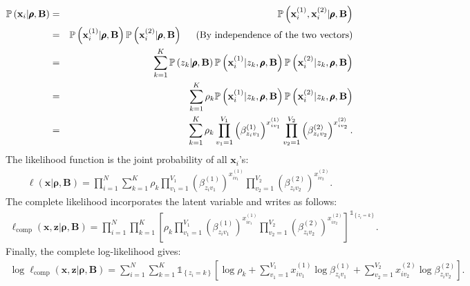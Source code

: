 \documentclass[a4paper, 11pt]{article}
\begin{document}
\begin{eqnarray}
\mathbb{P}\left( \mathbf{x}_i | \pmb{\rho}, \mathbf{B} \right) &=& \mathbb{P}\left( \mathbf{x}_i^{(1)}, \mathbf{x}_i^{(2)} | \pmb{\rho}, \mathbf{B} \right) \nonumber \\
&=& \mathbb{P}\left(\mathbf{x}_i^{(1)} | \pmb{\rho}, \mathbf{B}\right)\mathbb{P}\left(\mathbf{x}_i^{(2)} | \pmb{\rho}, \mathbf{B}\right)\hspace{0.5cm} \text{(By independence of the two vectors)} \nonumber \\
&=& \sum_{k=1}^{K} \mathbb{P}\left(z_k | \pmb{\rho}, \mathbf{B}\right)\mathbb{P}\left(\mathbf{x}_i^{(1)} | z_k, \pmb{\rho}, \mathbf{B}\right)\mathbb{P}\left(\mathbf{x}_i^{(2)} | z_k, \pmb{\rho}, \mathbf{B}\right)\nonumber \\
&=& \sum_{k=1}^{K} \rho_k \mathbb{P}\left(\mathbf{x}_i^{(1)} | z_k, \pmb{\rho}, \mathbf{B}\right)\mathbb{P}\left(\mathbf{x}_i^{(2)} | z_k, \pmb{\rho}, \mathbf{B}\right)\nonumber \\
&=& \sum_{k=1}^{K} \rho_k \prod_{v_1=1}^{V_1} \left( \beta_{z_i v_1}^{(1)} \right)^{x_{i v_1}^{(1)}} \prod_{v_2=1}^{V_2} \left( \beta_{z_i v_2}^{(2)} \right)^{x_{i v_2}^{(2)}}. \nonumber
\end{eqnarray}
The likelihood function is the joint probability of all $\mathbf{x}_i$'s:
\begin{eqnarray}
\ell (\mathbf{x} | \pmb{\rho}, \mathbf{B}) = \prod_{i=1}^N \sum_{k=1}^{K} \rho_k \prod_{v_1=1}^{V_1} \left( \beta_{z_i v_1}^{(1)} \right)^{x_{i v_1}^{(1)}} \prod_{v_2=1}^{V_2} \left( \beta_{z_i v_2}^{(2)} \right)^{x_{i v_2}^{(2)}}. \nonumber
\end{eqnarray}
The complete likelihood incorporates the latent variable and writes as follows:
\begin{eqnarray}
\ell_{\text{comp}} (\mathbf{x}, \mathbf{z} | \pmb{\rho}, \mathbf{B}) = \prod_{i=1}^N \prod_{k=1}^{K} \left[ \rho_k \prod_{v_1=1}^{V_1} \left( \beta_{z_i v_1}^{(1)} \right)^{x_{i v_1}^{(1)}} \prod_{v_2=1}^{V_2} \left( \beta_{z_i v_2}^{(2)} \right)^{x_{i v_2}^{(2)}} \right]^{\mathbb{1}_{ \left\{ z_i = k \right\} }}. \nonumber
\end{eqnarray}
Finally, the complete log-likelihood gives:
\begin{eqnarray}
\log \ell_{\text{comp}} (\mathbf{x}, \mathbf{z} | \pmb{\rho}, \mathbf{B}) = \sum_{i=1}^N \sum_{k=1}^{K} \mathbb{1}_{ \left\{ z_i = k \right\} } \left[ \log \rho_k + \sum_{v_1=1}^{V_1} x_{i v_1}^{(1)} \log \beta_{z_i v_1}^{(1)} + \sum_{v_2=1}^{V_2} x_{i v_2}^{(2)} \log \beta_{z_i v_2}^{(2)} \right]. \nonumber
\end{eqnarray}
\end{document}
